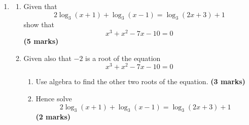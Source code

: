 \documentclass{../Templates/sbs-exam}
\newcommand{\imarks}[1]{\hfill \textbf{(#1 marks)}}
\begin{document}
\begin{enumerate}
\vspace{6cm}

\item %


\begin{enumerate}
    \item[(a)] Given that
    \[
    2\log_3(x + 1) + \log_3(x - 1) = \log_3(2x + 3) + 1
    \]
    show that
    \[
    x^3 + x^2 - 7x - 10 = 0
    \] \imarks{5}

    \item[(b)] Given also that \(-2\) is a root of the equation
    \[
    x^3 + x^2 - 7x - 10 = 0
    \]
    \begin{enumerate}
        \item[(i)] Use algebra to find the other two roots of the equation. \vspace{0.5cm} \imarks{3}
        \item[(ii)] Hence solve
        \[
        2\log_3(x + 1) + \log_3(x - 1) = \log_3(2x + 3) + 1
        \] \imarks{2}
    \end{enumerate}
\end{enumerate}

\end{enumerate}
\end{document}
